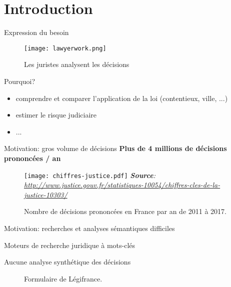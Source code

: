 \section{Introduction}

\begin{frame}[c]{Expression du besoin}
	
	\begin{figure}
		\texttt{[image: lawyerwork.png]}
		\caption{Les juristes analysent les décisions}
	\end{figure}
	
	\begin{block}{Pourquoi?}
		\begin{itemize}
			\item comprendre et comparer l'application de la loi (contentieux, ville, ...)
			\item estimer le risque judiciaire
			\item ... %
		\end{itemize}
	\end{block}
\end{frame}

\begin{frame}[c]{Motivation: gros volume de décisions}
	\textbf{Plus de 4 millions de décisions prononcées / an}
	\begin{figure}
		\texttt{[image: chiffres-justice.pdf]}
		\textit{\tiny{\textbf{Source}: \url{http://www.justice.gouv.fr/statistiques-10054/chiffres-cles-de-la-justice-10303/}}}
		\caption{Nombre de décisions prononcées en France par an de 2011 à 2017.}
	\end{figure}		
\end{frame}

\begin{frame}[t]{Motivation: recherches et analyses sémantiques difficiles}
	
	Moteurs de recherche juridique à mots-clés 
	
	Aucune analyse synthétique des décisions 
	
	\begin{figure}
		\centering
		\caption{Formulaire de Légifrance.}
	\end{figure}
\end{frame}

